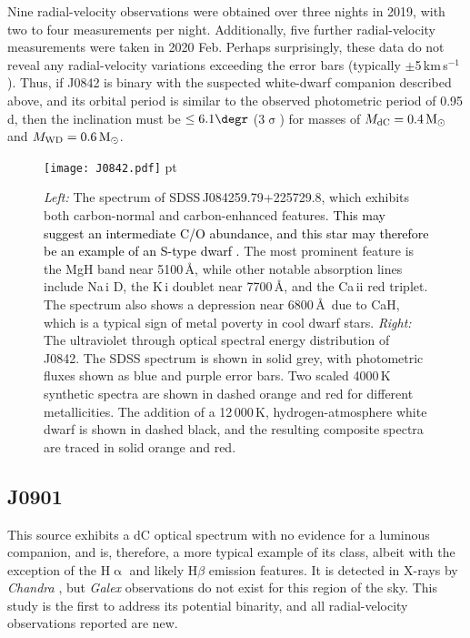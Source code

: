 \documentclass[fleqn,usenatbib,useAMS]{mnras}
\newcommand{\lw}[1]{\textcolor{black}{#1}}
\newcommand{\Msun}{\ensuremath{\rm{M}_\odot}}
\begin{document}
Nine radial-velocity observations were obtained over three nights in 2019, with two to four measurements per night.  Additionally, five further radial-velocity measurements were taken in 2020 Feb.  Perhaps surprisingly, these data do not reveal any radial-velocity variations exceeding the error bars (typically $\pm$5\,km\,s$^{-1}$).  Thus, if J0842 is binary with the suspected white-dwarf companion described above, and its orbital period is similar to the observed photometric period of 0.95\,d, then the inclination must be $\le6.1\degr$ ($3\upsigma$) for masses of $M_{\rm dC}=0.4\,\Msun$ and $M_{\rm WD}=0.6\,\Msun$.




\begin{figure*}
\texttt{[image: J0842.pdf]}
 pt
\caption{{\em Left:} The spectrum of SDSS\,J084259.79+225729.8, which exhibits both carbon-normal and carbon-enhanced features.  \lw{This may suggest an intermediate C/O abundance, and this star may therefore be an example of an S-type dwarf \citep{VEck17}.}  The most prominent feature is the MgH band near 5100\,\AA, while other notable absorption lines include Na\,{\sc i} D, the K\,{\sc i} doublet near 7700\,\AA, and the Ca\,{\sc ii} red triplet.  The spectrum also shows a depression near 6800\,\AA \ due to CaH, which is a typical sign of metal poverty in cool dwarf stars.  {\em Right:} The ultraviolet through optical spectral energy distribution of J0842.  The SDSS spectrum is shown in solid grey, with photometric fluxes shown as blue and purple error bars.  Two scaled 4000\,K synthetic spectra are shown in dashed orange and red for different metallicities.  The addition of a 12\,000\,K, hydrogen-atmosphere white dwarf is shown in dashed black, and the resulting composite spectra are traced in solid orange and red.}
\label{fig:J0842}
\end{figure*}




\subsection{J0901}

This source exhibits a dC optical spectrum with no evidence for a luminous companion, and is, therefore, a more typical example of its class, albeit with the exception of the H$\upalpha$ and likely H$\beta$ emission features.  It is detected in X-rays by {\em Chandra} \citep{Green19}, but {\em Galex} observations do not exist for this region of the sky.  This study is the first to address its potential binarity, and all radial-velocity observations reported are new.
\end{document}
